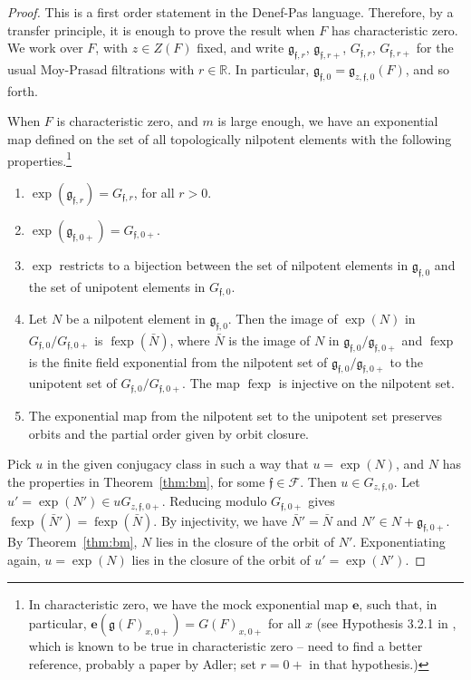\documentclass[12pt]{amsart}
\newcommand{\op}[1]{\operatorname{#1}}
\newcommand{\ring}[1]{{\mathbb #1}}
\def\s{{\mathfrak{f}}}
\newcommand{\cF}{\mathcal{F}}
\newcommand{\fg}{\mathfrak{g}}
\theoremstyle{plain}
\theoremstyle{definition}
\begin{document}
\begin{proof} This is a first order statement in the Denef-Pas
  language.  Therefore, by a transfer principle, it is enough to prove
  the result when $F$ has characteristic zero.  We work over $F$, with
  $z\in Z(F)$ fixed, and write $\fg_{\s,r}$, $\fg_{\s,r+}$, $G_{\s,r}$,
  $G_{\s,r+}$ for the usual Moy-Prasad filtrations with
  $r\in\ring{R}$.  In particular, $\fg_{\s,0}=\fg_{z,\s,0}(F)$, and so
  forth.

  When $F$ is characteristic zero, and $m$ is large enough, we have an
  exponential map defined on the set of all topologically nilpotent
  elements with the following properties.\footnote{In characteristic
    zero, we have the mock exponential map ${\mathbf e}$, such that,
    in particular, ${\mathbf e}(\fg(F)_{x,0+})=G(F)_{x, 0+}$ for all
    $x$ (see Hypothesis 3.2.1 in \cite{debacker:homogeneity}, which is
    known to be true in characteristic zero -- need to find a better
    reference, probably a paper by Adler; set $r=0+$ in that
    hypothesis.) }
  \begin{enumerate}
    \item $\exp(\fg_{\s,r}) = G_{\s,r}$, for all $r>0$.
    \item $\exp(\fg_{\s,0+}) = G_{\s,0+}$.
    \item $\exp$ restricts to a bijection between the set of
      nilpotent elements in $\fg_{\s,0}$ and the set of unipotent
      elements in $G_{\s,0}$.
   \item Let $N$ be a nilpotent element in $\fg_{\s,0}$.  Then the
     image of $\exp(N)$ in $G_{\s,0}/G_{\s,0+}$ is $\op{fexp}(\bar N)$,
     where $\bar N$ is the image of $N$ in $\fg_{\s,0}/\fg_{\s,0+}$ and
     $\op{fexp}$ is the finite field exponential from the nilpotent
     set of $\fg_{\s,0}/\fg_{\s,0+}$ to the unipotent set of
     $G_{\s,0}/G_{\s,0+}$. The map $\op{fexp}$ is injective on the
     nilpotent set.
   \item The exponential map from the nilpotent set to the unipotent
     set preserves orbits and the partial order given by orbit closure.
 \end{enumerate}

  Pick $u$ in the given conjugacy class in such a way that $u =
  \exp(N)$, and $N$ has the properties in Theorem~\ref{thm:bm}, for
  some $\s\in \cF$.
  Then $u\in G_{z,\s,0}$.  Let $u' = \exp(N') \in u G_{z,\s,0+}$.
  Reducing modulo
  $G_{\s,0+}$ gives $\op{fexp}(\bar N') = \op{fexp}(\bar N)$. By
  injectivity, we have $\bar N' = \bar N$ and $N' \in N +
  \fg_{\s,0+}$.  By Theorem~\ref{thm:bm}, $N$ lies in the closure of the
  orbit of $N'$.  Exponentiating again, $u = \exp(N)$ lies in the
  closure of the orbit of $u' = \exp(N')$.
\end{proof}
\end{document}

